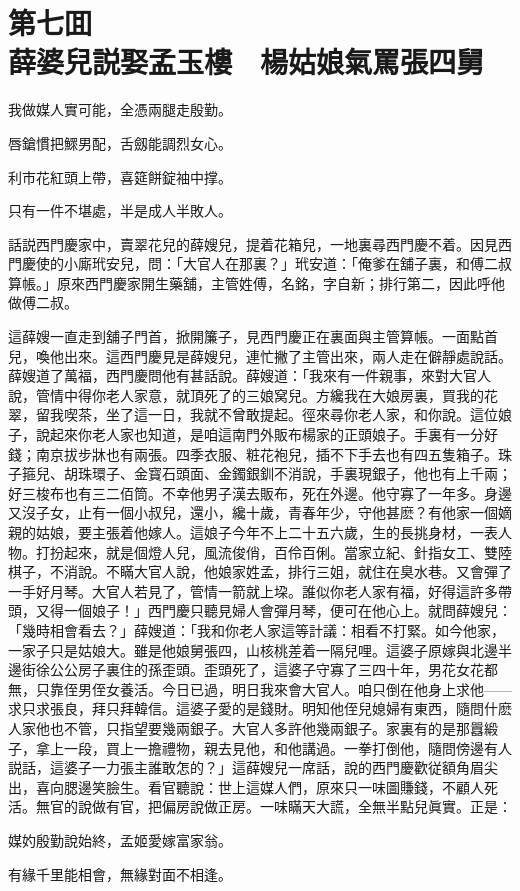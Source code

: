 
\chapter*{第七囬　\\薛婆兒説娶孟玉樓　楊姑娘氣罵張四舅}


\begin{myquote}
我做媒人實可能，全憑兩腿走殷勤。

唇鎗慣把鰥男配，舌劔能調烈女心。

利市花紅頭上帶，喜筵餅錠袖中撑。

只有一件不堪處，半是成人半敗人。
\end{myquote}

話説西門慶家中，賣翠花兒的薛嫂兒，提着花箱兒，一地裏尋西門慶不着。因見西門慶使的小廝玳安兒，問：「大官人在那裏？」玳安道：「俺爹在舖子裏，和傅二叔算帳。」原來西門慶家開生藥舖，主管姓傅，名銘，字自新；排行第二，因此呼他做傅二叔。

這薛嫂一直走到舖子門首，掀開簾子，見西門慶正在裏面與主管算帳。一面點首兒，喚他出來。這西門慶見是薛嫂兒，連忙撇了主管出來，兩人走在僻靜處說話。薛嫂道了萬福，西門慶問他有甚話說。薛嫂道：「我來有一件親事，來對大官人說，管情中得你老人家意，就頂死了的三娘窝兒。方纔我在大娘房裏，買我的花翠，留我喫茶，坐了這一日，我就不曾敢提起。徑來尋你老人家，和你說。這位娘子，說起來你老人家也知道，是咱這南門外販布楊家的正頭娘子。手裏有一分好錢；南京拔步牀也有兩張。四季衣服、粧花袍兒，插不下手去也有四五隻箱子。珠子箍兒、胡珠環子、金寳石頭面、金鐲銀釧不消說，手裏現銀子，他也有上千兩；好三梭布也有三二佰筒。不幸他男子漢去販布，死在外邊。他守寡了一年多。身邊又沒子女，止有一個小叔兒，還小，纔十歲，青春年少，守他甚麽？有他家一個嫡親的姑娘，要主張着他嫁人。這娘子今年不上二十五六歲，生的長挑身材，一表人物。打扮起來，就是個燈人兒，風流俊俏，百伶百俐。當家立紀、針指女工、雙陸棋子，不消說。不瞞大官人說，他娘家姓孟，排行三姐，就住在臭水巷。又會彈了一手好月琴。大官人若見了，管情一箭就上垜。誰似你老人家有福，好得這許多帶頭，又得一個娘子！」西門慶只聽見婦人會彈月琴，便可在他心上。就問薛嫂兒：「幾時相會看去？」薛嫂道：「我和你老人家這等計議：相看不打緊。如今他家，一家子只是姑娘大。雖是他娘舅張四，山核桃差着一隔兒哩。這婆子原嫁與北邊半邊街徐公公房子裏住的孫歪頭。歪頭死了，這婆子守寡了三四十年，男花女花都無，只靠侄男侄女養活。今日已過，明日我來會大官人。咱只倒在他身上求他——求只求張良，拜只拜韓信。這婆子愛的是錢財。明知他侄兒媳婦有東西，隨問什麽人家他也不管，只指望要幾兩銀子。大官人多許他幾兩銀子。家裏有的是那囂緞子，拿上一段，買上一擔禮物，親去見他，和他講過。一拳打倒他，隨問傍邊有人説話，這婆子一力張主誰敢怎的？」這薛嫂兒一席話，說的西門慶歡従額角眉尖出，喜向腮邊笑臉生。看官聽說：世上這媒人們，原來只一味圖賺錢，不顧人死活。無官的說做有官，把偏房說做正房。一味瞞天大謊，全無半點兒眞實。正是：
\begin{myquote}
媒妁殷勤說始終，孟姬愛嫁富家翁。

有緣千里能相會，無緣對面不相逢。
\end{myquote}

